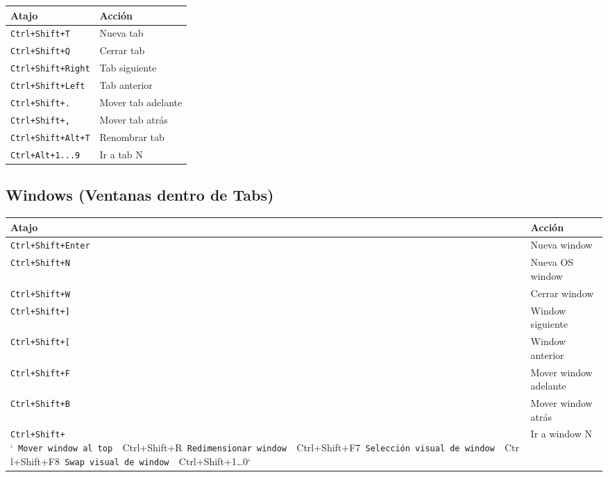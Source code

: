 \documentclass[
  doc,
  floatsintext,
  longtable,
  a4paper,
  nolmodern,
  notxfonts,
  notimes,
  12pt,
  colorlinks=true,linkcolor=blue,citecolor=blue,urlcolor=blue]{apa7}
\newcounter{none} %
\begin{document}
{\def\LTcaptype{none} %
\begin{longtable}[]{@{}ll@{}}
\toprule\noalign{}
Atajo & Acción \\
\midrule\noalign{}
\endhead
\bottomrule\noalign{}
\endlastfoot
\texttt{Ctrl+Shift+T} & Nueva tab \\
\texttt{Ctrl+Shift+Q} & Cerrar tab \\
\texttt{Ctrl+Shift+Right} & Tab siguiente \\
\texttt{Ctrl+Shift+Left} & Tab anterior \\
\texttt{Ctrl+Shift+.} & Mover tab adelante \\
\texttt{Ctrl+Shift+,} & Mover tab atrás \\
\texttt{Ctrl+Shift+Alt+T} & Renombrar tab \\
\texttt{Ctrl+Alt+1...9} & Ir a tab N \\
\end{longtable}
}

\subsection{Windows (Ventanas dentro de
Tabs)}\label{windows-ventanas-dentro-de-tabs}

{\def\LTcaptype{none} %
\begin{longtable}[]{@{}
  >{\raggedright\arraybackslash}p{}
  >{\raggedright\arraybackslash}p{}@{}}
\toprule\noalign{}
\begin{minipage}[b]{\linewidth}\raggedright
Atajo
\end{minipage} & \begin{minipage}[b]{\linewidth}\raggedright
Acción
\end{minipage} \\
\midrule\noalign{}
\endhead
\bottomrule\noalign{}
\endlastfoot
\texttt{Ctrl+Shift+Enter} & Nueva window \\
\texttt{Ctrl+Shift+N} & Nueva OS window \\
\texttt{Ctrl+Shift+W} & Cerrar window \\
\texttt{Ctrl+Shift+{]}} & Window siguiente \\
\texttt{Ctrl+Shift+{[}} & Window anterior \\
\texttt{Ctrl+Shift+F} & Mover window adelante \\
\texttt{Ctrl+Shift+B} & Mover window atrás \\
\texttt{Ctrl+Shift+\textasciigrave{}\textasciigrave{}}
`\texttt{\textbar{}\ Mover\ window\ al\ top\ \textbar{}\ \textbar{}}Ctrl+Shift+R\texttt{\textbar{}\ Redimensionar\ window\ \textbar{}\ \textbar{}}Ctrl+Shift+F7\texttt{\textbar{}\ Selección\ visual\ de\ window\ \textbar{}\ \textbar{}}Ctrl+Shift+F8\texttt{\textbar{}\ Swap\ visual\ de\ window\ \textbar{}\ \textbar{}}Ctrl+Shift+1\ldots0`
& Ir a window N \\
\end{longtable}
}
\end{document}
